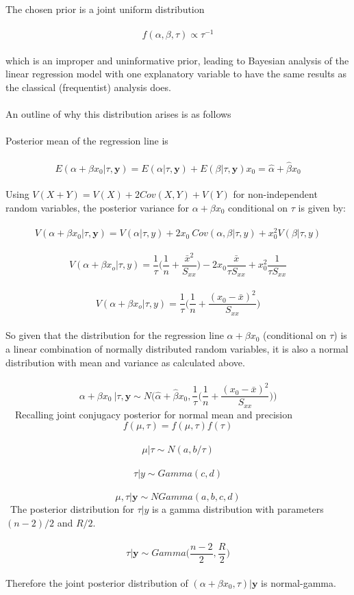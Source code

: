 \documentclass[11pt]{article}   	%
\begin{document}
The chosen prior is a joint uniform distribution \\
\
\[ f( \alpha, \beta, \tau) \propto \tau^{-1} \]
\\
which is an improper and uninformative prior, leading to Bayesian analysis of the linear regression model with one explanatory variable to have the same results as the classical (frequentist) analysis does. \\
\\
An outline of why this distribution arises is as follows \\
\\
Posterior mean of the regression line is \\
\
\[ E(\alpha + \beta x_0 | \tau, \mathbf{y} ) = E( \alpha | \tau, \mathbf{y}) + E(\beta | \tau, \mathbf{y}) x_0 = \hat{\alpha} + \hat{\beta} x_0 \]
\\
Using $ V (X + Y ) = V (X) + 2 Cov(X, Y ) + V (Y ) $ for non-independent random variables, the posterior variance for $ \alpha + \beta x_0 $ conditional on $ \tau $ is given by: \\
\
\[ V(\alpha + \beta x_0 | \tau, \mathbf{y} ) = V(\alpha | \tau, y) + 2 x_0 \ Cov(\alpha, \beta | \tau, y) + x_{0}^{2} V(\beta | \tau, y) \]
\
\[ V( \alpha + \beta x_o | \tau, y) = \frac{1}{\tau} \Bigg( \frac{1}{n} + \frac{ \bar{x}^2 }{ S_{xx} } \Bigg) - 2x_0 \frac{\bar{x}}{\tau S_{xx}} + x_0^2 \frac{1}{\tau S_{xx}} \]
\
\[ V( \alpha + \beta x_o | \tau, y) = \frac{1}{\tau} \Bigg( \frac{1}{n} + \frac{ ( x_0 - \bar{x})^2 }{ S_{xx} } \Bigg) \]
\\
So given that the distribution for the regression line $ \alpha + \beta x_0 $ (conditional on $ \tau $) is a linear combination of normally distributed random variables, it is also a normal distribution with mean and variance as calculated above. \\
\
\[ \alpha + \beta x_0 \ | \tau, \mathbf{y} \sim N \Bigg( \hat{ \alpha } + \hat{ \beta } x_0, \frac{1}{\tau} \bigg( \frac{1}{n} + \frac{(x_0 - \bar{x})^2}{S_{xx}} \bigg) \Bigg) \] \
\
Recalling joint conjugacy posterior for normal mean and precision \
\
\[ f(\mu, \tau) = f(\mu, \tau) f(\tau) \]
\
\[ \mu | \tau \sim N(a, b/\tau) \]
\
\[ \tau | y \sim Gamma(c, d) \]
\
\[ \mu, \tau | \mathbf{y} \sim NGamma(a, b, c, d) \]
\
The posterior distribution for $ \tau | y $ is a gamma distribution with parameters $ (n - 2)/2 $ and $ R/2 $. \\
\
\[ \tau | \mathbf{y} \sim Gamma \bigg( \frac{n-2}{2}, \frac{R}{2} \bigg) \]
\\
Therefore the joint posterior distribution of $ (\alpha + \beta x_0, \tau) | \mathbf{y} $ is normal-gamma. \\
\end{document}
